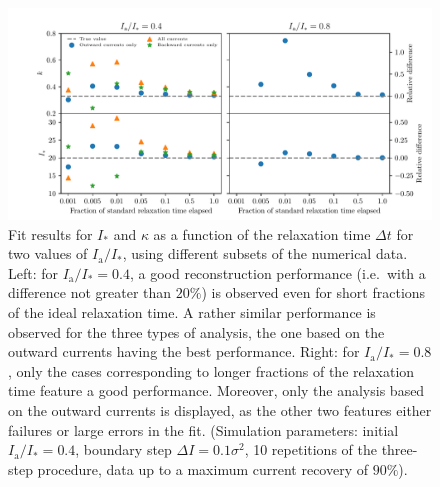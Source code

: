 \begin{figure}[htp]
    \centering
    \includegraphics[width=\textwidth]{4_probing_the_diffusive_behavior/figs/final/better_plot.pdf}
    \caption{Fit results for $I_\ast$ and $\kappa$ as a function of the relaxation time $\Delta t$ for two values of $I_\mathrm{a}/I_\ast$, using different subsets of the numerical data. Left: for $I_\mathrm{a}/I_\ast=0.4$, a good reconstruction performance  {(i.e.\ with a difference not greater than $20\%$)} is observed even for short fractions of the ideal relaxation time. A rather similar performance is observed for the three types of analysis, the one based on the outward currents having the best performance. Right: for $I_\mathrm{a} / I_\ast=0.8$, only the cases corresponding to longer fractions of the relaxation time feature a good performance. Moreover, only the analysis based on the outward currents is displayed, as the other two features either failures or large errors in the fit. (Simulation parameters: initial $I_\mathrm{a}/I_\ast=0.4$, boundary step $\Delta I =0.1 \sigma^2$, 10 repetitions of the three-step procedure, data up to a maximum current recovery of $90\%$).}
    \label{fig:all_different_time}
\end{figure}
%

